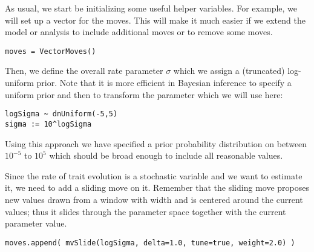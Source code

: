 
As usual, we start be initializing some useful helper variables.
For example, we will set up a vector for the moves.
This will make it much easier if we extend the model or analysis to include additional moves or to remove some moves.
{\tt \begin{snugshade*}
\begin{lstlisting}
moves = VectorMoves() 
\end{lstlisting}
\end{snugshade*}}

Then, we define the overall rate parameter $\sigma$ which we assign a (truncated) log-uniform prior. Note that it is more efficient in Bayesian inference to specify a uniform prior and then to transform the parameter which we will use here:
{\tt \small \begin{snugshade*}
\begin{lstlisting}
logSigma ~ dnUniform(-5,5)
sigma := 10^logSigma
\end{lstlisting}
\end{snugshade*}}
Using this approach we have specified a prior probability distribution on  between $10^{-5}$ to $10^5$ which should be broad enough to include all reasonable values.

Since the rate of trait evolution  is a stochastic variable and we want to estimate it, we need to add a sliding move on it. Remember that the sliding move proposes new values drawn from a window with width  and is centered around the current values; thus it slides through the parameter space together with the current parameter value.
{\tt \small \begin{snugshade*}
\begin{lstlisting}
moves.append( mvSlide(logSigma, delta=1.0, tune=true, weight=2.0) )
\end{lstlisting}
\end{snugshade*}}

